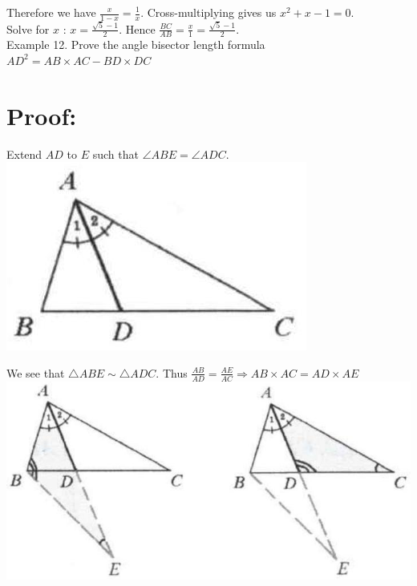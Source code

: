 \documentclass[10pt]{article}
\begin{document}
Therefore we have \(\frac{x}{1-x}=\frac{1}{x}\). Cross-multiplying gives us \(x^{2}+x-1=0\).\\
Solve for \(x\) : \(x=\frac{\sqrt{5}-1}{2}\). Hence \(\frac{B C}{A B}=\frac{x}{1}=\frac{\sqrt{5}-1}{2}\).\\
Example 12. Prove the angle bisector length formula\\
\(A D^{2}=A B \times A C-B D \times D C\)

\section*{Proof:}
Extend \(A D\) to \(E\) such that \(\angle A B E=\angle A D C\).\\
\includegraphics[max width=\textwidth, center]{2025_04_17_97bc1f7e44d93c271a88g-062}

We see that \(\triangle A B E \sim \triangle A D C\). Thus \(\frac{A B}{A D}=\frac{A E}{A C} \Rightarrow A B \times A C=A D \times A E\)\\
\includegraphics[max width=\textwidth, center]{2025_04_17_97bc1f7e44d93c271a88g-063(1)}
\end{document}
